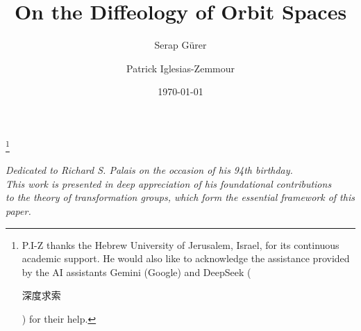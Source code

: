 \documentclass[10pt,reqno,letterpaper,twoside]{amsart}
\theoremstyle{article}
\begin{document}
  
  \title{On the Diffeology of Orbit Spaces}
  
  
  \author{Serap G{\"u}rer}
  \address{Serap G{\"u}rer,
  Galatasaray University,
  Ortaköy, Çırağan Cd. No:$36$,
  $34349$ Beşiktaş\,/\,İstanbul, Turkey.}
  
  \author{Patrick Iglesias-Zemmour}
  \address{Patrick Iglesias-Zemmour,
  Einstein Institute of Mathematics,
  The Hebrew University of Jerusalem,
  Edmond J. Safra Campus,
  Givat Ram,
  $9190401$ Jerusalem,
  Israel.
  }
  \thanks{P.I-Z thanks the Hebrew University of Jerusalem, Israel, for its continuous academic support.
  He would also like to acknowledge the assistance provided by the AI assistants Gemini (Google) and DeepSeek (\begin{CJK}{UTF8}{gbsn}深度求索\end{CJK}) for their help.} %
  
  
  \date{\today}
  
  
  \maketitle
  
  \begin{center}
    \it
    Dedicated to Richard S. Palais on the occasion of his 94th birthday. \\
    This work is presented in deep appreciation of his foundational contributions \\
    to the theory of transformation groups, which form the essential framework of this paper.
  \end{center}
  
  
  
\end{document}
